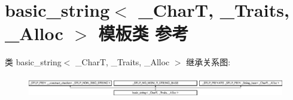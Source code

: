 \hypertarget{classbasic__string}{}\section{basic\+\_\+string$<$ \+\_\+\+CharT, \+\_\+\+Traits, \+\_\+\+Alloc $>$ 模板类 参考}
\label{classbasic__string}
类 basic\+\_\+string$<$ \+\_\+\+CharT, \+\_\+\+Traits, \+\_\+\+Alloc $>$ 继承关系图\+:\begin{figure}[H]
\begin{center}
\leavevmode
\includegraphics[height=0.942761cm]{classbasic__string}
\end{center}
\end{figure}
